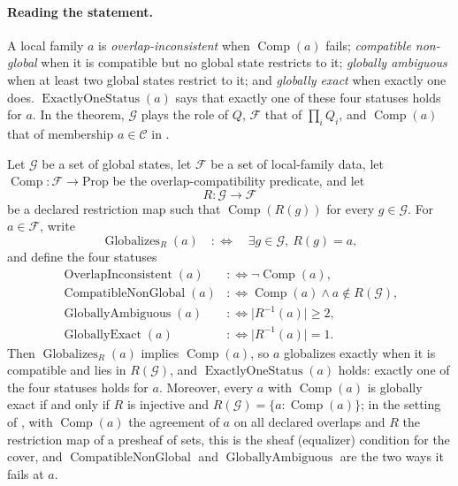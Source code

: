 \paragraph{Reading the statement.}
A local family \(a\) is \emph{overlap-inconsistent} when
\(\operatorname{Comp}(a)\) fails; \emph{compatible non-global} when it
is compatible but no global state restricts to it; \emph{globally
ambiguous} when at least two global states restrict to it; and
\emph{globally exact} when exactly one does.
\(\operatorname{ExactlyOneStatus}(a)\) says that exactly one of these
four statuses holds for \(a\). In the theorem, \(\mathcal G\) plays the role
of \(Q\), \(\mathcal F\) that of \(\prod_i Q_i\), and
\(\operatorname{Comp}(a)\) that of membership \(a\in\mathcal C\) in
.

\begin{theorem}\label{thm:F4}
Let \(\mathcal G\) be a set of global states, let \(\mathcal F\) be a
set of local-family data, let
\(\operatorname{Comp}:\mathcal F\to\mathrm{Prop}\) be the
overlap-compatibility predicate, and let
\[
  R:\mathcal G\longrightarrow\mathcal F
\]
be a declared restriction map such that
\(\operatorname{Comp}(R(g))\) for every \(g\in\mathcal G\).  For
\(a\in\mathcal F\), write
\[
  \operatorname{Globalizes}_R(a)
  \quad:\Longleftrightarrow\quad
  \exists g\in\mathcal G,\ R(g)=a,
\]
and define the four statuses
\begin{align*}
  \operatorname{OverlapInconsistent}(a)&:\iff\neg\operatorname{Comp}(a),\\
  \operatorname{CompatibleNonGlobal}(a)&:\iff\operatorname{Comp}(a)\wedge a\notin R(\mathcal G),\\
  \operatorname{GloballyAmbiguous}(a)&:\iff\lvert R^{-1}(a)\rvert\ge 2,\\
  \operatorname{GloballyExact}(a)&:\iff\lvert R^{-1}(a)\rvert=1.
\end{align*}
Then \(\operatorname{Globalizes}_R(a)\) implies \(\operatorname{Comp}(a)\), so
\(a\) globalizes exactly when it is compatible and lies in \(R(\mathcal G)\),
and \(\operatorname{ExactlyOneStatus}(a)\) holds: exactly one of the
four statuses holds for \(a\). Moreover, every \(a\) with \(\operatorname{Comp}(a)\)
is globally exact if and only if \(R\) is injective and
\(R(\mathcal G)=\{a:\operatorname{Comp}(a)\}\); in the setting of
, with \(\operatorname{Comp}(a)\) the agreement of
\(a\) on all declared overlaps and \(R\) the restriction map of a presheaf of
sets, this is the sheaf (equalizer) condition for the cover, and
\(\operatorname{CompatibleNonGlobal}\) and \(\operatorname{GloballyAmbiguous}\)
are the two ways it fails at \(a\).
\end{theorem}

